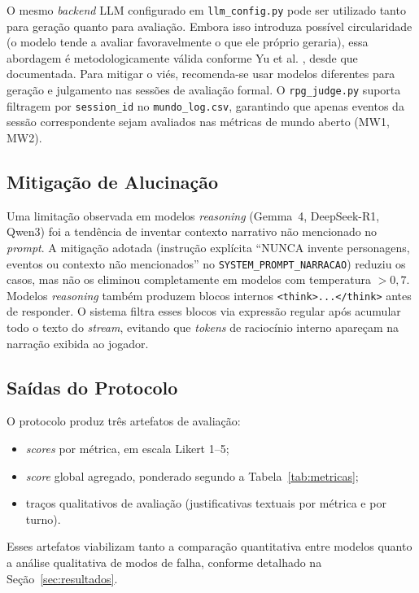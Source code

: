 \documentclass[12pt]{article}
\begin{document}
O mesmo \textit{backend} LLM configurado em \texttt{llm\_config.py} pode ser utilizado tanto para geração quanto para avaliação. Embora isso introduza possível circularidade (o modelo tende a avaliar favoravelmente o que ele próprio geraria), essa abordagem é metodologicamente válida conforme Yu et al. \cite{yu:2025}, desde que documentada. Para mitigar o viés, recomenda-se usar modelos diferentes para geração e julgamento nas sessões de avaliação formal. O \texttt{rpg\_judge.py} suporta filtragem por \texttt{session\_id} no \texttt{mundo\_log.csv}, garantindo que apenas eventos da sessão correspondente sejam avaliados nas métricas de mundo aberto (MW1, MW2).

\subsection{Mitigação de Alucinação}

Uma limitação observada em modelos \textit{reasoning} (Gemma~4, DeepSeek-R1, Qwen3) foi a tendência de inventar contexto narrativo não mencionado no \textit{prompt}. A mitigação adotada (instrução explícita ``NUNCA invente personagens, eventos ou contexto não mencionados'' no \texttt{SYSTEM\_PROMPT\_NARRACAO}) reduziu os casos, mas não os eliminou completamente em modelos com temperatura $> 0{,}7$. Modelos \textit{reasoning} também produzem blocos internos \texttt{<think>...</think>} antes de responder. O sistema filtra esses blocos via expressão regular após acumular todo o texto do \textit{stream}, evitando que \textit{tokens} de raciocínio interno apareçam na narração exibida ao jogador.

\subsection{Saídas do Protocolo}

O protocolo produz três artefatos de avaliação:

\begin{itemize}[leftmargin=2.4em]
  \item \textit{scores} por métrica, em escala Likert 1--5;
  \item \textit{score} global agregado, ponderado segundo a Tabela~\ref{tab:metricas};
  \item traços qualitativos de avaliação (justificativas textuais por métrica e por turno).
\end{itemize}

Esses artefatos viabilizam tanto a comparação quantitativa entre modelos quanto a análise qualitativa de modos de falha, conforme detalhado na Seção~\ref{sec:resultados}.
\end{document}
